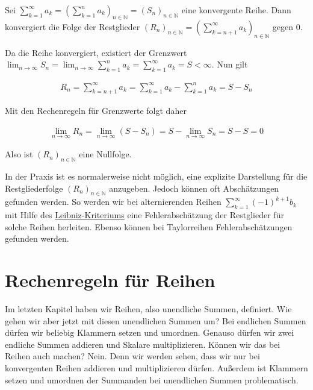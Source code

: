 \documentclass[fontsize=9pt,
               parskip=half-,
               DIV=14,
               listof=chapterentry,
               tocflat]{scrbook}
\begin{document}
\begin{theorem*}
Sei $\sum _{k=1}^{\infty }a_{k}=\left(\sum _{k=1}^{n}a_{k}\right)_{n\in \mathbb {N} }=(S_{n})_{n\in \mathbb {N} }$ eine konvergente Reihe. Dann konvergiert die Folge der Restglieder $(R_{n})_{n\in \mathbb {N} }=\left(\sum _{k=n+1}^{\infty }a_{k}\right)_{n\in \mathbb {N} }$ gegen $0$.

\end{theorem*}

\begin{proof*}
Da die Reihe konvergiert, existiert der Grenzwert $\lim _{n\to \infty }S_{n}=\lim _{n\to \infty }\sum _{k=1}^{n}a_{k}=\sum _{k=1}^{\infty }a_{k}=S<\infty $. Nun gilt

\begin{align*}
R_{n}=\sum _{k=n+1}^{\infty }a_{k}=\sum _{k=1}^{\infty }a_{k}-\sum _{k=1}^{n}a_{k}=S-S_{n}
\end{align*}

Mit den Rechenregeln für Grenzwerte folgt daher

\begin{align*}
\lim _{n\to \infty }R_{n}=\lim _{n\to \infty }(S-S_{n})=S-\lim _{n\to \infty }S_{n}=S-S=0
\end{align*}

Also ist $(R_{n})_{n\in \mathbb {N} }$ eine Nullfolge.

\end{proof*}

\begin{hint*}
In der Praxis ist es normalerweise nicht möglich, eine explizite Darstellung für die Restgliederfolge $(R_{n})_{n\in \mathbb {N} }$ anzugeben. Jedoch können oft Abschätzungen gefunden werden. So werden wir bei alternierenden Reihen $\sum _{k=1}^{\infty }(-1)^{k+1}b_{k}$ mit Hilfe des \href{https://de.wikibooks.org/wiki/Mathe\_für\_Nicht-Freaks:\_Leibniz-Kriterium}
{Leibniz-Kriteriums} eine Fehlerabschätzung der Restglieder für solche Reihen herleiten. Ebenso können bei Taylorreihen Fehlerabschätzungen gefunden werden.

\end{hint*}



\chapter{Rechenregeln für Reihen}

Im letzten Kapitel haben wir Reihen, also unendliche Summen, definiert. Wie gehen wir aber jetzt mit diesen unendlichen Summen um? Bei endlichen Summen dürfen wir beliebig Klammern setzen und umordnen. Genauso dürfen wir zwei endliche Summen addieren und Skalare multiplizieren. Können wir das bei Reihen auch machen? Nein. Denn wir werden sehen, dass wir nur bei konvergenten Reihen addieren und multiplizieren dürfen. Außerdem ist Klammern setzen und umordnen der Summanden bei unendlichen Summen problematisch.
\end{document}
